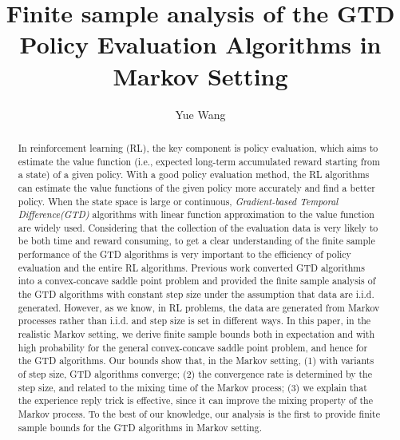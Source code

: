 \documentclass[twoside,11pt]{article}
\numberwithin{equation}{section}
\begin{document}
\title{Finite sample analysis of the GTD Policy Evaluation Algorithms in Markov Setting}

\author{Yue Wang}


\maketitle

\begin{abstract}%
		In reinforcement learning (RL), the key component is policy evaluation, which aims to estimate the value function (i.e., expected long-term accumulated reward starting from a state) of a given policy. With a good policy evaluation method, the RL algorithms can estimate the value functions of the given policy more accurately and find a better policy. When the state space is large or continuous, \emph{Gradient-based Temporal Difference(GTD)} algorithms with linear function approximation to the value function are widely used. Considering that the collection of the evaluation data is very likely to be both time and reward consuming, to get a clear understanding of the finite sample performance of the GTD algorithms is very important to the efficiency of policy evaluation and the entire RL algorithms. Previous work converted GTD algorithms into a convex-concave saddle point problem and provided the finite sample analysis of the GTD algorithms with constant step size  under the assumption that data are i.i.d. generated. However, as we know, in RL problems, the data are generated from Markov processes rather than i.i.d. and step size  is set in different ways. In this paper, in the realistic Markov setting, we derive finite sample bounds both in expectation and with high probability for the general convex-concave saddle point problem, and hence for the GTD algorithms. Our bounds show that, in the Markov  setting, (1) with variants of step size, GTD algorithms converge; (2) the convergence rate is determined by the step size, and related to the mixing time of the Markov process; (3) we explain that the experience reply trick is effective, since it can improve the mixing property of the Markov process.  To the best of our knowledge, our analysis is the first to provide finite sample bounds for the GTD algorithms in Markov setting. 

\end{abstract}
\end{document}

